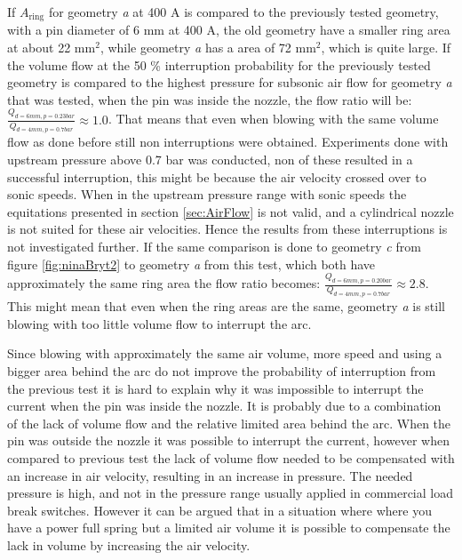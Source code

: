 \documentclass[10pt,a4paper,twoside]{article}
\begin{document}
If $A_\mathrm{{ring}}$ for geometry \textit{a} at 400 A is compared to the previously tested geometry, with a pin diameter of 6 mm at 400 A, the old geometry have a smaller ring area at about 22 $\mathrm{{mm^2}}$, while geometry \textit{a} has a area of 72 $\mathrm{{mm^2}}$, which is quite large. If the volume flow at the 50 \% interruption probability for the previously tested geometry is compared to the highest pressure for subsonic air flow for geometry \textit{a} that was tested, when the pin was inside the nozzle, the flow ratio will be: $\frac{Q_{d=6 mm, p=0.23 bar}}{Q_{d=4 mm, p=0.7 bar}}\approx 1.0$. That means that even when blowing with the same volume flow as done before still non interruptions were obtained. Experiments done with upstream pressure above 0.7 bar was conducted, non of these resulted in a successful interruption, this might be because the air velocity crossed over to sonic speeds. When in the upstream pressure range with sonic speeds the equitations presented in section \ref{sec:AirFlow} is not valid, and a cylindrical nozzle is not suited for these air velocities. Hence the results from these interruptions is not investigated further. If the same comparison is done to geometry \textit{c} from figure \ref{fig:ninaBryt2} to geometry \textit{a} from this test, which both have approximately the same ring area the flow ratio becomes: $\frac{Q_{d=6 mm, p=0.20 bar}}{Q_{d=4 mm, p=0.7 bar}}\approx 2.8$. This might mean that even when the ring areas are the same, geometry \textit{a} is still blowing with too little volume flow to interrupt the arc.

Since blowing with approximately the same air volume, more speed and using a bigger area behind the arc do not improve the probability of interruption from the previous test it is hard to explain why it was impossible to interrupt the current when the pin was inside the nozzle. It is probably due to a combination of the lack of volume flow and the relative limited area behind the arc. When the pin was outside the nozzle it was possible to interrupt the current, however when compared to previous test the lack of volume flow needed to be compensated with an increase in air velocity, resulting in an increase in pressure. The needed pressure is high, and not in the pressure range usually applied in commercial load break switches. However it can be argued that in a situation where where you have a power full spring but a limited air volume it is possible to compensate the lack in volume by increasing the air velocity.
\end{document}

